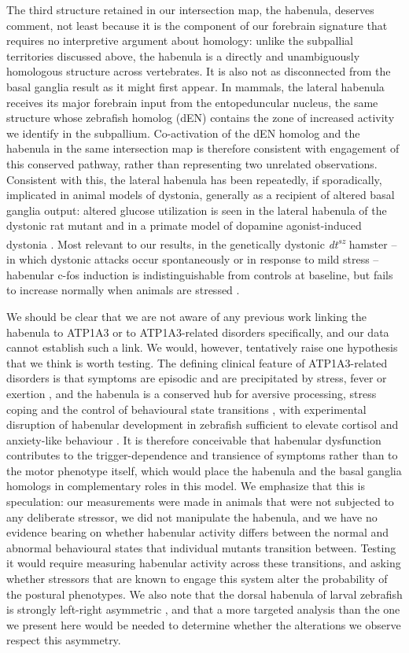 \documentclass[9.5pt,lineno]{RandlettLab_elife}
\begin{document}
The third structure retained in our intersection map, the habenula, deserves comment, not least because it is the component of our forebrain signature that requires no interpretive argument about homology: unlike the subpallial territories discussed above, the habenula is a directly and unambiguously homologous structure across vertebrates.
It is also not as disconnected from the basal ganglia result as it might first appear.
In mammals, the lateral habenula receives its major forebrain input from the entopeduncular nucleus, the same structure whose zebrafish homolog (dEN) contains the zone of increased activity we identify in the subpallium.
Co-activation of the dEN homolog and the habenula in the same intersection map is therefore consistent with engagement of this conserved pathway, rather than representing two unrelated observations.
Consistent with this, the lateral habenula has been repeatedly, if sporadically, implicated in animal models of dystonia, generally as a recipient of altered basal ganglia output: altered glucose utilization is seen in the lateral habenula of the dystonic rat mutant \citep{Brown1989} and in a primate model of dopamine agonist-induced dystonia \citep{Mitchell1990}.
Most relevant to our results, in the genetically dystonic \emph{dt\textsuperscript{sz}} hamster -- in which dystonic attacks occur spontaneously or in response to mild stress -- habenular c-fos induction is indistinguishable from controls at baseline, but fails to increase normally when animals are stressed \citep{Ebert1996}.

We should be clear that we are not aware of any previous work linking the habenula to ATP1A3 or to ATP1A3-related disorders specifically, and our data cannot establish such a link.
We would, however, tentatively raise one hypothesis that we think is worth testing.
The defining clinical feature of ATP1A3-related disorders is that symptoms are episodic and are precipitated by stress, fever or exertion \citep{Salles2021-bq}, and the habenula is a conserved hub for aversive processing, stress coping and the control of behavioural state transitions \citep{Okamoto2021}, with experimental disruption of habenular development in zebrafish sufficient to elevate cortisol and anxiety-like behaviour \citep{Facchin2015}.
It is therefore conceivable that habenular dysfunction contributes to the trigger-dependence and transience of symptoms rather than to the motor phenotype itself, which would place the habenula and the basal ganglia homologs in complementary roles in this model.
We emphasize that this is speculation: our measurements were made in animals that were not subjected to any deliberate stressor, we did not manipulate the habenula, and we have no evidence bearing on whether habenular activity differs between the normal and abnormal behavioural states that individual mutants transition between.
Testing it would require measuring habenular activity across these transitions, and asking whether stressors that are known to engage this system alter the probability of the postural phenotypes.
We also note that the dorsal habenula of larval zebrafish is strongly left-right asymmetric \citep{Facchin2015}, and that a more targeted analysis than the one we present here would be needed to determine whether the alterations we observe respect this asymmetry.
\end{document}
